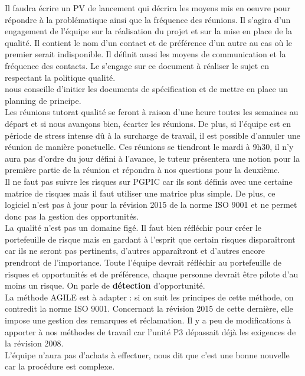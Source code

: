\documentclass [a4paper] {article}
\begin{document}
Il faudra écrire un PV de lancement qui décrira les moyens mis en oeuvre pour répondre à la problématique ainsi que la fréquence des réunions. Il s'agira d'un engagement de l'équipe sur la réalisation du projet et sur la mise en place de la qualité.
Il contient le nom d'un contact et de préférence d'un autre au cas où le premier serait indisponible. Il définit aussi les moyens de communication et la fréquence des contacts.
Le \CP{} s'engage sur ce document à réaliser le sujet en respectant la politique qualité.
\\
\nomTuteurQualite{} nous conseille d'initier les documents de spécification et de mettre en place un planning de principe.
\\
Les réunions tutorat qualité se feront à raison d'une heure toutes les semaines au départ et si nous avançons bien, écarter les réunions. De plus, si l'équipe est en période de stress intense dû à la surcharge de travail, il est possible d'annuler une réunion de manière ponctuelle. Ces réunions se tiendront le mardi à 9h30, il n'y aura pas d'ordre du jour défini à l'avance, le tuteur présentera une notion pour la première partie de la réunion et répondra à nos questions pour la deuxième.
\\
Il ne faut pas suivre les risques sur PGPIC car ils sont définis avec une certaine matrice de risques mais il faut utiliser une matrice plus simple. De plus, ce logiciel n'est pas à jour pour la révision 2015 de la norme ISO 9001 et ne permet donc pas la gestion des opportunités.
\\
La qualité n'est pas un domaine figé. Il faut bien réfléchir pour créer le portefeuille de risque mais en gardant à l'esprit que certain risques disparaîtront car ils ne seront pas pertinents, d'autres apparaîtront et d'autres encore prendront de l'importance. Toute l'équipe devrait réfléchir au portefeuille de risques et opportunités et de préférence, chaque personne devrait être pilote d'au moins un risque. On parle de \textbf{détection} d'opportunité.
\\
La méthode AGILE est à adapter : si on suit les principes de cette méthode, on contredit la norme ISO 9001. Concernant la révision 2015 de cette dernière, elle impose une gestion des remarques et réclamation. Il y a peu de modifications à apporter à nos méthodes de travail car l'unité P3 dépassait déjà les exigences de la révision 2008.
\\
L'équipe n'aura pas d'achats à effectuer, \nomTuteurQualite{} nous dit que c'est une bonne nouvelle car la procédure est complexe.
\end{document}
